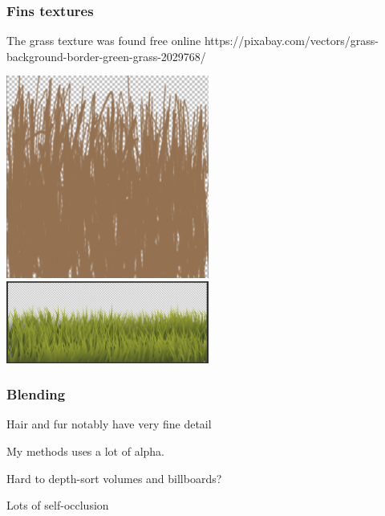 \documentclass[12pt]{beamer}
\begin{document}
    \begin{frame}
        \frametitle{ Fins textures }
        The grass texture was found free online
        https://pixabay.com/vectors/grass-background-border-green-grass-2029768/

        \includegraphics[width=0.5\textwidth]{rickystrands}%
        \includegraphics[width=0.5\textwidth]{terrainstrands}
    \end{frame}

    \begin{frame}
        \frametitle{Blending}

        Hair and fur notably have very fine detail

        My methods uses a lot of alpha.

        Hard to depth-sort volumes and billboards?

        Lots of self-occlusion
    \end{frame}
\end{document}

